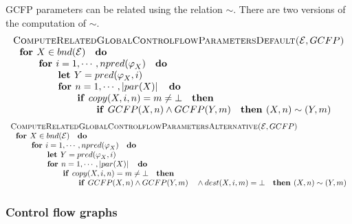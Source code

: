 GCFP parameters can be related using the relation $\sim $. There are two
versions of the computation of $\sim $.%
\begin{equation*}
\begin{tabular}{l}
\textsc{ComputeRelatedGlobalControlflowParametersDefault(}$\mathcal{E},GCFP$%
\textsc{)} \\ 
$\text{\textbf{for }}X\in bnd(\mathcal{E})\text{ \textbf{do}}$ \\ 
$\qquad \text{\textbf{for }}i=1,\cdots ,npred(\varphi _{X})\text{ \textbf{do}%
}$ \\ 
$\qquad \qquad \text{\textbf{let }}Y=pred(\varphi _{X},i)$ \\ 
$\qquad \qquad \text{\textbf{for }}n=1,\cdots ,\left\vert par(X)\right\vert 
\text{ \textbf{do}}$ \\ 
$\qquad \qquad \qquad \text{\textbf{if }}copy(X,i,n)=m\neq \bot \text{ 
\textbf{then}}$ \\ 
$\qquad \qquad \qquad \qquad \text{\textbf{if }}GCFP(X,n)\wedge GCFP(Y,m)%
\text{ \textbf{then }}(X,n)\sim (Y,m)$%
\end{tabular}%
\end{equation*}%
\begin{equation*}
\begin{tabular}{l}
\textsc{ComputeRelatedGlobalControlflowParametersAlternative(}$\mathcal{E}%
,GCFP$\textsc{)} \\ 
$\text{\textbf{for }}X\in bnd(\mathcal{E})\text{ \textbf{do}}$ \\ 
$\qquad \text{\textbf{for }}i=1,\cdots ,npred(\varphi _{X})\text{ \textbf{do}%
}$ \\ 
$\qquad \qquad \text{\textbf{let }}Y=pred(\varphi _{X},i)$ \\ 
$\qquad \qquad \text{\textbf{for }}n=1,\cdots ,\left\vert par(X)\right\vert 
\text{ \textbf{do}}$ \\ 
$\qquad \qquad \qquad \text{\textbf{if }}copy(X,i,n)=m\neq \bot \text{ 
\textbf{then}}$ \\ 
$\qquad \qquad \qquad \qquad \text{\textbf{if }}GCFP(X,n)\wedge GCFP(Y,m)%
\text{ }\wedge dest(X,i,m)=\bot \text{ \textbf{then }}(X,n)\sim (Y,m)$%
\end{tabular}%
\end{equation*}

\subsubsection{Control flow graphs}

